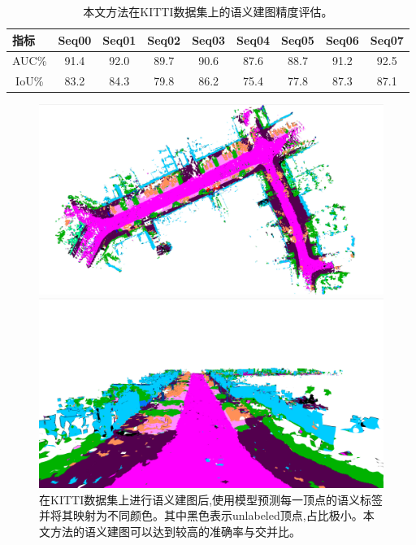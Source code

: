 \begin{table}[htbp]
    \centering
    \caption{本文方法在KITTI数据集上的语义建图精度评估。}\label{kittimetrics}
    \begin{tabular}[htbp]{cccccccccc}
        \toprule
        \multicolumn{2}{l}{指标} & Seq00 & Seq01 & Seq02 &Seq03&Seq04&Seq05&Seq06&Seq07 \\
        \midrule
        \multicolumn{2}{l}{AUC\%} & 91.4 & 92.0 & 89.7 & 90.6 &87.6&88.7&91.2&92.5\\
        \multicolumn{2}{c}{IoU\%} & 83.2& 84.3&79.8&86.2&75.4&77.8&87.3&87.1 \\
        \bottomrule
    \end{tabular}
\end{table}
\begin{figure}[htbp]
	\centering
	\begin{minipage}{1\linewidth}
		\centering
		\includegraphics[width=1\linewidth]{figures/sem1.png}
	\end{minipage}
    \vfill
	\begin{minipage}{1\linewidth}
		\centering
		\includegraphics[width=1\linewidth]{figures/sem2.png}
	\end{minipage}
    \caption{在KITTI数据集上进行语义建图后,使用模型预测每一顶点的语义标签并将其映射为不同颜色。其中黑色表示unlabeled顶点,占比极小。本文方法的语义建图可以达到较高的准确率与交并比。}\label{semresult}
\end{figure}

